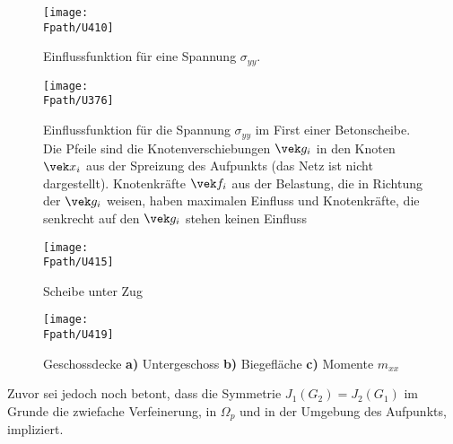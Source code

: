 {{{%
\begin{figure}
\centering
{\texttt{[image: \\Fpath/U410]}}
  \caption{Einflussfunktion f\"{u}r eine Spannung $\sigma_{yy}$.} \label{U410}
\end{figure}

\begin{figure}
\centering
{\texttt{[image: \\Fpath/U376]}}
  \caption{Einflussfunktion f\"{u}r die Spannung $\sigma_{yy}$ im First einer Betonscheibe. Die Pfeile sind die Knotenverschiebungen $\vek g_i$ in den Knoten $\vek x_i$ aus der Spreizung des Aufpunkts (das Netz ist nicht dargestellt). Knotenkr\"{a}fte $\vek f_i$ aus der Belastung, die in Richtung der $\vek g_i$ weisen, haben maximalen Einfluss und Knotenkr\"{a}fte, die senkrecht auf den $\vek g_i$ stehen keinen Einfluss} \label{U376}
\end{figure}

\begin{figure}[tbp]
\centering
\if {} \sidecaption \fi
\texttt{[image: \\Fpath/U415]}
\caption{Scheibe unter Zug} \label{U415}
%
\end{figure}%

\begin{figure}[tbp]
\centering
\if {} \sidecaption \fi
\texttt{[image: \\Fpath/U419]}
\caption{ Geschossdecke \textbf{ a)} Untergeschoss \textbf{ b)} Biegefl\"{a}che \textbf{ c)} Momente $m_{xx}$} \label{U419}\label{Korrektur24}
\end{figure}%


Zuvor sei jedoch noch betont, dass die Symmetrie $J_1(G_2) = J_2(G_1)$ im Grunde die zwiefache Verfeinerung, in $\Omega_p$ und in der Umgebung des Aufpunkts, impliziert.

}}}
